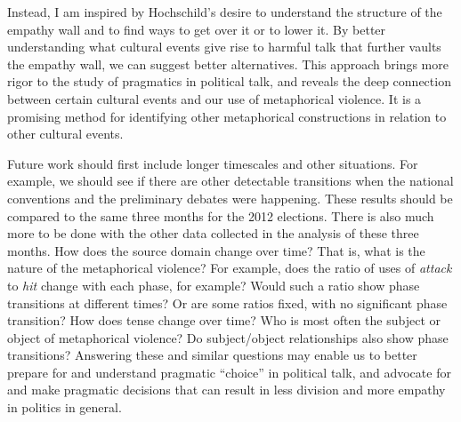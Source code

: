 Instead, I am inspired by Hochschild's desire to understand the structure
of the empathy wall and to find ways to get over it or to lower it. By better
understanding what cultural events give rise to harmful talk that further vaults
the empathy wall, we can suggest better alternatives. This approach brings
more rigor to the study of pragmatics in political talk, and reveals the
deep connection between certain cultural events and our use of metaphorical
violence. It is a promising method for identifying other metaphorical 
constructions in relation to other cultural events.

Future work should first include longer timescales and other situations. For
example, we should see if there are other detectable transitions when the national 
conventions and the preliminary debates were happening. These results 
should be compared to the same three months for the 2012 elections. There is
also much more to be done with the other data collected in the analysis of 
these three months. How does the source domain change over time? That is, 
what is the nature of the metaphorical violence? For example, does
the ratio of uses of \textit{attack} to \textit{hit} change
with each phase, for example? Would such a ratio show phase transitions
at different times? Or are some ratios fixed, with no significant phase
transition? How does tense change over time? Who is most often the subject
or object of metaphorical violence? Do subject/object relationships also
show phase transitions? Answering these and similar questions may enable us
to better prepare for and understand pragmatic ``choice'' in political talk, 
and advocate for and make pragmatic decisions that can result in less division
and more empathy in politics in general.
